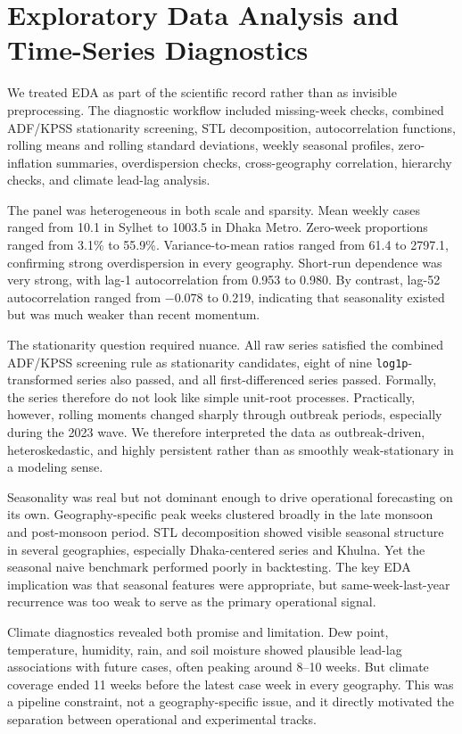 \documentclass[11pt]{article}
\begin{document}
\section{Exploratory Data Analysis and Time-Series Diagnostics}
We treated EDA as part of the scientific record rather than as invisible preprocessing. The diagnostic workflow included missing-week checks, combined ADF/KPSS stationarity screening, STL decomposition, autocorrelation functions, rolling means and rolling standard deviations, weekly seasonal profiles, zero-inflation summaries, overdispersion checks, cross-geography correlation, hierarchy checks, and climate lead-lag analysis.

The panel was heterogeneous in both scale and sparsity. Mean weekly cases ranged from 10.1 in Sylhet to 1003.5 in Dhaka Metro. Zero-week proportions ranged from 3.1\% to 55.9\%. Variance-to-mean ratios ranged from 61.4 to 2797.1, confirming strong overdispersion in every geography. Short-run dependence was very strong, with lag-1 autocorrelation from 0.953 to 0.980. By contrast, lag-52 autocorrelation ranged from $-0.078$ to 0.219, indicating that seasonality existed but was much weaker than recent momentum.

The stationarity question required nuance. All raw series satisfied the combined ADF/KPSS screening rule as stationarity candidates, eight of nine \texttt{log1p}-transformed series also passed, and all first-differenced series passed. Formally, the series therefore do not look like simple unit-root processes. Practically, however, rolling moments changed sharply through outbreak periods, especially during the 2023 wave. We therefore interpreted the data as outbreak-driven, heteroskedastic, and highly persistent rather than as smoothly weak-stationary in a modeling sense.

Seasonality was real but not dominant enough to drive operational forecasting on its own. Geography-specific peak weeks clustered broadly in the late monsoon and post-monsoon period. STL decomposition showed visible seasonal structure in several geographies, especially Dhaka-centered series and Khulna. Yet the seasonal naive benchmark performed poorly in backtesting. The key EDA implication was that seasonal features were appropriate, but same-week-last-year recurrence was too weak to serve as the primary operational signal.

Climate diagnostics revealed both promise and limitation. Dew point, temperature, humidity, rain, and soil moisture showed plausible lead-lag associations with future cases, often peaking around 8--10 weeks. But climate coverage ended 11 weeks before the latest case week in every geography. This was a pipeline constraint, not a geography-specific issue, and it directly motivated the separation between operational and experimental tracks.
\end{document}
